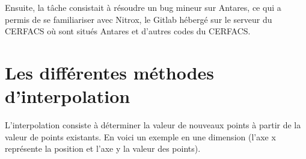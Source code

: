 Ensuite, la tâche consistait à résoudre un bug mineur sur Antares, ce qui a permis de se familiariser avec Nitrox, le Gitlab hébergé sur le serveur du CERFACS où sont situés Antares et d'autres codes du CERFACS.


\section{Les différentes méthodes d'interpolation}

L'interpolation consiste à déterminer la valeur de nouveaux points à partir de la valeur de points existants. En voici un exemple en une dimension (l'axe x représente la position et l'axe y la valeur des points).

\vspace{0,5cm}


\begin{center}
\end{center}

\vspace{0,5cm}

